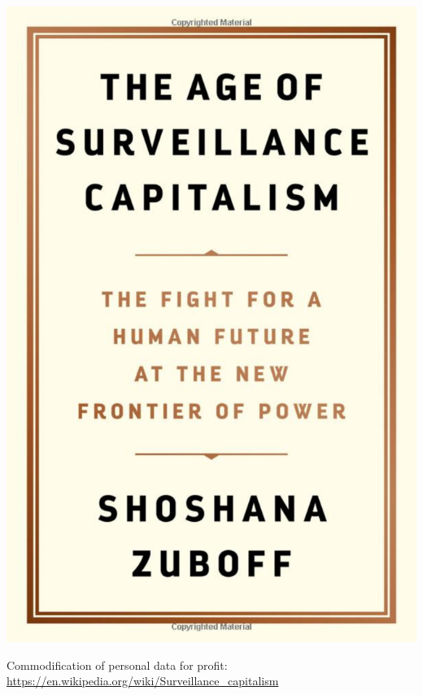 \documentclass[aspectratio=169]{beamer}
\begin{document}
\begin{frame}

\begin{center}
\includegraphics[height=0.8\textheight]{figures/zuboff_age_2019_cover}
\end{center}

\vfill

Commodification of personal data for profit: \url{https://en.wikipedia.org/wiki/Surveillance_capitalism}

\end{frame}
\end{document}
